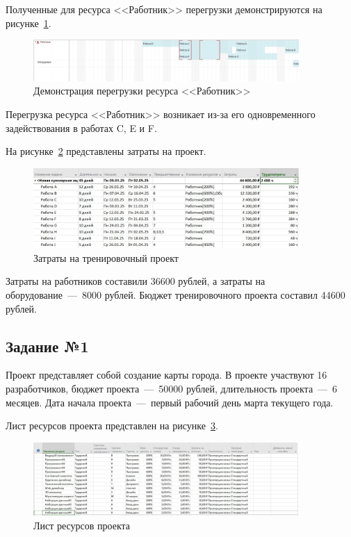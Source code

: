 Полученные для ресурса <<Работник>> перегрузки демонстрируются на рисунке~\ref{fig:test_overflow}.

\begin{figure}[H]
	\centering
	\includegraphics[width=0.9\textwidth]{img/lab2/test/overflow.jpg}
	\caption{Демонстрация перегрузки ресурса <<Работник>>}
	\label{fig:test_overflow}
\end{figure}

Перегрузка ресурса <<Работник>> возникает из-за его одновременного задействования в работах C, E и F.

На рисунке~\ref{fig:test_final} представлены затраты на проект.

\begin{figure}[H]
	\centering
	\includegraphics[width=0.9\textwidth]{img/lab2/test/final.jpg}
	\caption{Затраты на тренировочный проект}
	\label{fig:test_final}
\end{figure}

Затраты на работников составили 36600 рублей, а затраты на оборудование~---~8000 рублей.
Бюджет тренировочного проекта составил 44600 рублей.

\subsection{Задание №1}

Проект представляет собой создание карты города.
В проекте участвуют 16 разработчиков, бюджет проекта~---~50000 рублей, длительность проекта~---~6 месяцев.
Дата начала проекта~---~первый рабочий день марта текущего года.

Лист ресурсов проекта представлен на рисунке~\ref{fig:list}.

\begin{figure}[H]
	\centering
	\includegraphics[width=0.9\textwidth]{img/lab2/task1/list.jpg}
	\caption{Лист ресурсов проекта}
	\label{fig:list}
\end{figure}

